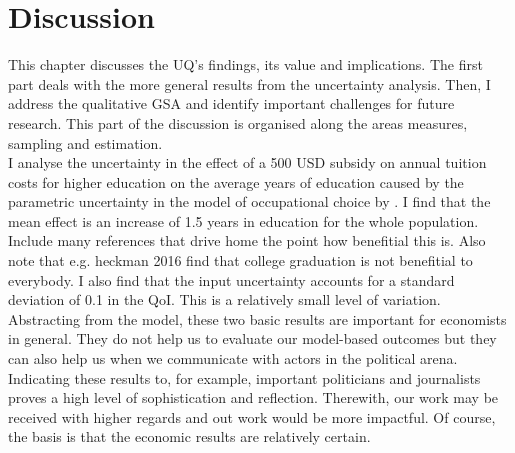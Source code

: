 \section{Discussion}
\thispagestyle{plain}  %

This chapter discusses the UQ's findings, its value and implications. The first part deals with the more general results from the uncertainty analysis. Then, I address the qualitative GSA and identify important challenges for future research. This part of the discussion is organised along the areas measures, sampling and estimation.\\

\noindent
I analyse the uncertainty in  the effect of a 500 USD subsidy on annual tuition costs for higher education on the average years of education caused by the parametric uncertainty in the model of occupational choice by \cite{Keane.1994}. I find that the mean effect is an increase of 1.5 years in education for the whole population. {\color{red}Include many references that drive home the point how benefitial this is. Also note that e.g. heckman 2016 find that college graduation is not benefitial to everybody.}
I also find that the input uncertainty accounts for a standard deviation of 0.1 in the QoI. This is a relatively small level of variation. Abstracting from the model, these two basic results are important for economists in general. They do not help us to evaluate our model-based outcomes but they can also help us when we communicate with actors in the political arena. Indicating these results to, for example, important politicians and journalists proves a high level of sophistication and reflection. Therewith, our work may be received with higher regards and out work would be more impactful. Of course, the basis is that the economic results are relatively certain.\\

